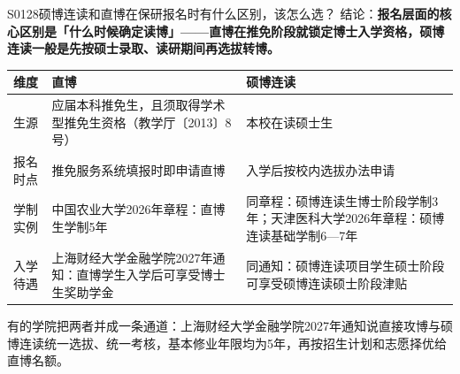 \begin{qa}{S0128}{硕博连读和直博在保研报名时有什么区别，该怎么选？}
结论：\textbf{报名层面的核心区别是「什么时候确定读博」——直博在推免阶段就锁定博士入学资格，硕博连读一般是先按硕士录取、读研期间再选拔转博。}

\par\vspace{2pt}\nobreak\begin{center}\footnotesize
\begin{tabularx}{\textwidth}{>{\raggedright\arraybackslash}X>{\raggedright\arraybackslash}X>{\raggedright\arraybackslash}X}
\toprule
\textbf{维度} & \textbf{直博} & \textbf{硕博连读} \\ \midrule
生源 & 应届本科推免生，且须取得学术型推免生资格（教学厅〔2013〕8号） & 本校在读硕士生 \\
报名时点 & 推免服务系统填报时即申请直博 & 入学后按校内选拔办法申请 \\
学制实例 & 中国农业大学2026年章程：直博生学制5年 & 同章程：硕博连读生博士阶段学制3年；天津医科大学2026年章程：硕博连读基础学制6—7年 \\
入学待遇 & 上海财经大学金融学院2027年通知：直博学生入学后可享受博士生奖助学金 & 同通知：硕博连读项目学生硕士阶段可享受硕博连读硕士阶段津贴 \\
\bottomrule
\end{tabularx}
\end{center}\vspace{2pt}\par

有的学院把两者并成一条通道：上海财经大学金融学院2027年通知说直接攻博与硕博连读统一选拔、统一考核，基本修业年限均为5年，再按招生计划和志愿择优给直博名额。
\end{qa}

